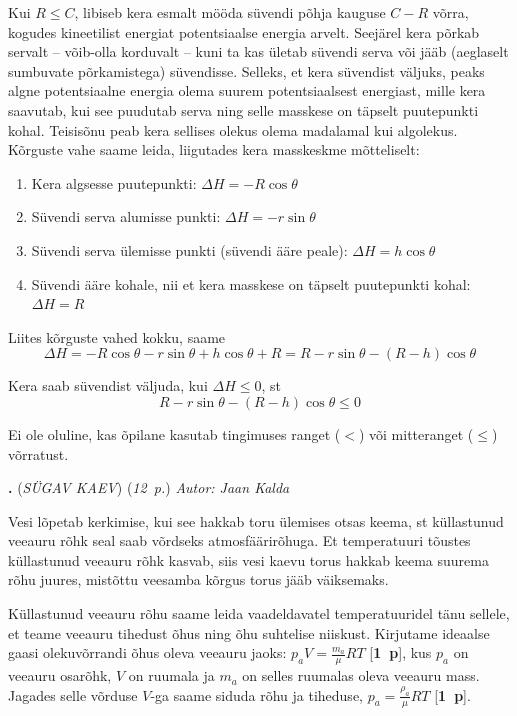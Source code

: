 \documentclass[11pt,a5paper]{article}
\newcommand{\numb}[1]{\vspace{5pt}\textbf{\large #1}}
\newcommand{\nimi}[1]{(\textsl{\small #1})}
\newcommand{\punktid}[1]{(\emph{#1~p.})}
\newcommand{\p}[1]{[\textbf{#1~p}]}
\newcounter{ylesanne}
\newcommand{\yl}[1]{\addtocounter{ylesanne}{1}\numb{\theylesanne.} \nimi{#1} \newblock{}}
\newcommand{\autor}[1]{\emph{Autor: #1}}%
\renewcommand{\leq}{\leqslant}
\begin{document}
Kui $R \leq C$, libiseb kera esmalt mööda süvendi põhja kauguse $C - R$ võrra, kogudes kineetilist energiat potentsiaalse energia arvelt. Seejärel kera põrkab servalt -- võib-olla korduvalt -- kuni ta kas ületab süvendi serva või jääb (aeglaselt sumbuvate põrkamistega) süvendisse. Selleks, et kera süvendist väljuks, peaks algne potentsiaalne energia olema suurem potentsiaalsest energiast, mille kera saavutab, kui see puudutab serva ning selle masskese on täpselt puutepunkti kohal. Teisisõnu peab kera sellises olekus olema madalamal kui algolekus. Kõrguste vahe saame leida, liigutades kera masskeskme mõtteliselt:
\begin{enumerate}
    \item Kera algsesse puutepunkti: $\Delta H = -R\cos\theta$
    \item Süvendi serva alumisse punkti: $\Delta H = -r\sin\theta$
    \item Süvendi serva ülemisse punkti (süvendi ääre peale): $\Delta H = h\cos\theta$
    \item Süvendi ääre kohale, nii et kera masskese on täpselt puutepunkti kohal: $\Delta H = R$
\end{enumerate}
Liites kõrguste vahed kokku, saame
\begin{equation*}
    \Delta H = -R\cos\theta - r\sin\theta + h\cos\theta + R = R-r\sin\theta-(R-h)\cos\theta
\end{equation*}

Kera saab süvendist väljuda, kui $\Delta H \leq 0$, st
\begin{equation*}
    R-r\sin\theta-(R-h)\cos\theta \leq 0
\end{equation*}

Ei ole oluline, kas õpilane kasutab tingimuses ranget ($<$) või mitteranget ($\leq$) võrratust.

\yl{SÜGAV KAEV}
\punktid{12} \autor{Jaan Kalda}

Vesi lõpetab kerkimise, kui see hakkab toru ülemises otsas keema, st küllastunud veeauru rõhk seal saab võrdseks atmosfäärirõhuga. Et temperatuuri tõustes küllastunud veeauru rõhk kasvab, siis vesi kaevu torus hakkab keema suurema rõhu juures, mistõttu veesamba kõrgus torus jääb väiksemaks.

Küllastunud veeauru rõhu saame leida vaadeldavatel temperatuuridel tänu sellele, et teame veeauru tihedust õhus ning õhu suhtelise niiskust. Kirjutame ideaalse gaasi olekuvõrrandi õhus oleva veeauru jaoks: $p_aV=\frac {m_a}\mu RT$ \p{1}, kus $p_a$ on veeauru osarõhk, $V$ on ruumala ja $m_a$ on selles ruumalas oleva veeauru mass. Jagades selle võrduse $V$-ga saame siduda rõhu ja tiheduse, $p_a=\frac {\rho_a}\mu RT$ \p{1}.
\end{document}
